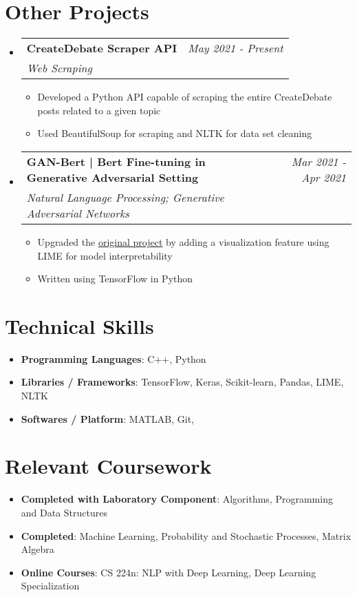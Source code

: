 \documentclass[a4,10pt]{article}
\makeatletter
\newcommand{\resumeItem}[2]{
  \item\small{
    \textbf{#1}{: #2 \vspace{-2pt}}
  }
}
\newcommand{\resumeSubheading}[4]{
  \vspace{-1pt}\item
    \begin{tabular*}{0.97\textwidth}{l@{\extracolsep{\fill}}r}
      \textbf{#1} & #2 \\
      \small#3 & \small#4\\
    \end{tabular*}\vspace{-5pt}
}
\newcommand{\resumeSubItem}[2]{\resumeItem{#1}{#2}\vspace{-4pt}}
\newcommand{\resumeSubHeadingListStart}{\begin{itemize}[leftmargin=*]}
\newcommand{\resumeSubHeadingListEnd}{\end{itemize}}
\makeatother
\begin{document}
\section{Other Projects}
  \resumeSubHeadingListStart
    \resumeSubheading
      {CreateDebate Scraper API \href{https://github.com/utkarsh512/CreateDebate-Scraper}{\faGithub}}{\textit{May 2021 - Present}}
      {\textit{Web Scraping}}{}
      \begin{itemize}
      \itemsep-0.15em
      \item {Developed a Python API capable of scraping the entire CreateDebate posts related to a given topic}
      \item {Used BeautifulSoup for scraping and NLTK for data set cleaning}
      \end{itemize}
  
    \resumeSubheading
      {GAN-Bert | Bert Fine-tuning in Generative Adversarial Setting \href{https://github.com/utkarsh512/ganbert}{\faGithub}}{\textit{Mar 2021 - Apr 2021}}
      {\textit{Natural Language Processing; Generative Adversarial Networks}}{}
      \begin{itemize}
      \itemsep-0.15em
      \item {Upgraded the \href{https://github.com/crux82/ganbert}{original project} by adding a visualization feature using LIME for model interpretability}
      \item {Written using TensorFlow in Python}
      \end{itemize}
  \resumeSubHeadingListEnd
  
\section{Technical Skills}
  \resumeSubHeadingListStart
    \resumeSubItem{Programming Languages}
      {C++, Python}
    \resumeSubItem{Libraries / Frameworks}
      {TensorFlow, Keras, Scikit-learn, Pandas, LIME, NLTK}
    \resumeSubItem{Softwares / Platform}
      {MATLAB, Git, \LaTeXe}
  \resumeSubHeadingListEnd

  
 \section{Relevant Coursework}
  \resumeSubHeadingListStart
    \resumeSubItem{Completed with Laboratory Component}
      {Algorithms, Programming and Data Structures}
    \resumeSubItem{Completed}
      {Machine Learning, Probability and Stochastic Processes, Matrix Algebra}
    \resumeSubItem{Online Courses}
      {CS 224n: NLP with Deep Learning, Deep Learning Specialization}
  \resumeSubHeadingListEnd
  
\end{document}

